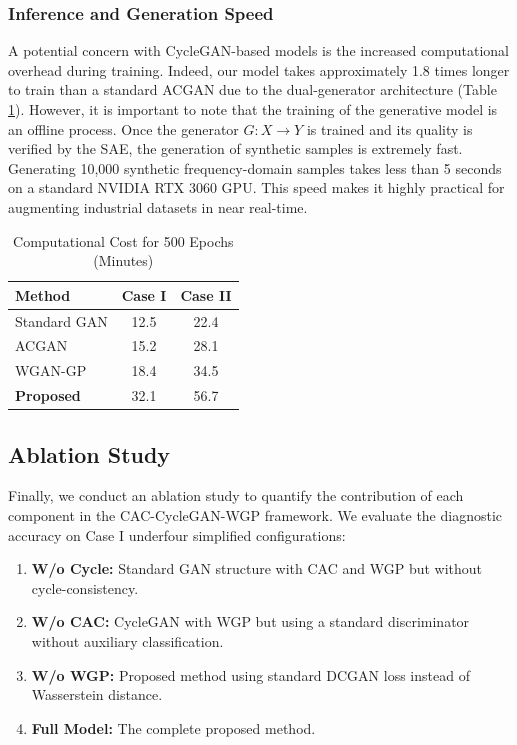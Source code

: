 \subsubsection{Inference and Generation Speed}
A potential concern with CycleGAN-based models is the increased computational overhead during training. Indeed, our model takes approximately 1.8 times longer to train than a standard ACGAN due to the dual-generator architecture (Table \ref{tab:comp_cost}). However, it is important to note that the training of the generative model is an offline process. Once the generator $G: X \to Y$ is trained and its quality is verified by the SAE, the generation of synthetic samples is extremely fast. Generating 10,000 synthetic frequency-domain samples takes less than 5 seconds on a standard NVIDIA RTX 3060 GPU. This speed makes it highly practical for augmenting industrial datasets in near real-time.

\begin{table}[htbp]
\centering
\caption{Computational Cost for 500 Epochs (Minutes)}
\label{tab:comp_cost}
\begin{tabular}{lcc}
\hline
\textbf{Method} & \textbf{Case I} & \textbf{Case II} \\ \hline
Standard GAN & 12.5 & 22.4 \\
ACGAN & 15.2 & 28.1 \\
WGAN-GP & 18.4 & 34.5 \\
\textbf{Proposed} & 32.1 & 56.7 \\
\hline
\end{tabular}
\end{table}

\subsection{Ablation Study}
Finally, we conduct an ablation study \cite{shao2017deep_autoencoder} to quantify the contribution of each component in the CAC-CycleGAN-WGP framework. We evaluate the diagnostic accuracy on Case I underfour simplified configurations:
\begin{enumerate}
    \item \textbf{W/o Cycle:} Standard GAN structure with CAC and WGP but without cycle-consistency.
    \item \textbf{W/o CAC:} CycleGAN with WGP but using a standard discriminator without auxiliary classification.
    \item \textbf{W/o WGP:} Proposed method using standard DCGAN loss instead of Wasserstein distance.
    \item \textbf{Full Model:} The complete proposed method.
\end{enumerate}

